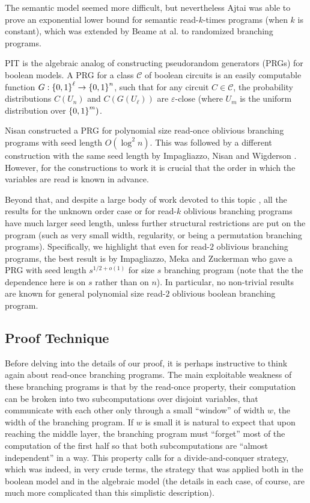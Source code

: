 \documentclass[11pt]{article}
\def\epsilon{\varepsilon} %
\begin{document}
The semantic model seemed more difficult, but nevertheless Ajtai \cite{Ajtai05} was able to prove an exponential lower bound for semantic read-$k$-times programs (when $k$ is constant), which was extended by Beame at al. \cite{BSSV03} to randomized branching programs.

\medskip

PIT is the algebraic analog of constructing pseudorandom generators (PRGs) for boolean models. A PRG for a class $\mathcal{C}$ of boolean circuits is an easily computable function $G : \left\{ 0,1 \right\}^{\ell} \to \left\{ 0,1 \right\}^n$, such that for any circuit $C \in \mathcal{C}$, the probability distributions $C(U_n)$ and $C(G(U_{\ell}))$ are $\epsilon$-close (where $U_m$ is the uniform distribution over $\left\{ 0,1 \right\}^m)$.

Nisan \cite{Nisan92} constructed a PRG for polynomial size read-once oblivious branching programs with seed length $O(\log^2 n)$. This was followed by a different construction with the same seed length by Impagliazzo, Nisan and Wigderson \cite{INW94}. However, for the constructions to work it is crucial that the order in which the variables are read is known in advance.

Beyond that, and despite a large body of work devoted to this topic \cite{BDVY13, BPW11, BRRY14, De11, GMRTV12, IMZ12, KNP11, RSV13, Steinke12,  SVW14}, all the results for the unknown order case or for read-$k$ oblivious branching programs have much larger seed length, unless further structural restrictions are put on the program (such as very small width, regularity, or being a permutation branching programs). Specifically, we highlight that even for read-$2$ oblivious branching programs, the best result is by Impagliazzo, Meka and Zuckerman \cite{IMZ12} who gave a PRG with seed length $s^{1/2 + o(1)}$ for size $s$ branching program (note that the the dependence here is on $s$ rather than on $n$). In particular, no non-trivial results are known for general polynomial size read-$2$ oblivious boolean branching program.

\subsection{Proof Technique}
\label{sec:technique}

Before delving into the details of our proof, it is perhaps instructive to think again about read-once branching programs. The main exploitable weakness of these branching programs is that by the read-once property, their computation can be broken into two subcomputations over disjoint variables, that communicate with each other only through a small ``window'' of width $w$, the width of the branching program. If $w$ is small it is natural to expect that upon reaching the middle layer, the branching program must ``forget'' most of the computation of the first half so that both subcomputations are ``almost independent'' in a way. This property calls for a divide-and-conquer strategy, which was indeed, in very crude terms, the strategy that was applied both in the boolean model \cite{Nisan92} and in the algebraic model \cite{FS13, FSS14, agks15} (the details in each case, of course, are much more complicated than this simplistic description).
\end{document}
